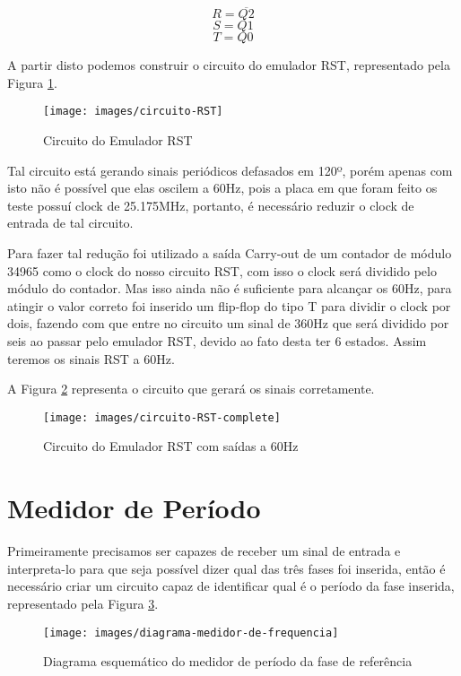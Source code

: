 $$R = \overline{Q2}$$
$$S = Q1$$
$$T = Q0$$

A partir disto podemos construir o circuito do emulador RST, representado pela Figura \ref{fig:circuito-RST}.

\begin{figure}[!htp]
	\centering
	\caption{Circuito do Emulador RST}
	\texttt{[image: images/circuito-RST]}
	\label{fig:circuito-RST}
\end{figure}

Tal circuito está gerando sinais periódicos defasados em 120º, porém apenas com isto não é possível que elas oscilem a 60Hz, pois a placa em que foram feito os teste possuí clock de 25.175MHz, portanto, é necessário reduzir o clock de entrada de tal circuito. 

Para fazer tal redução foi utilizado a saída Carry-out de um contador de módulo 34965 como o clock do nosso circuito RST, com isso o clock será dividido pelo módulo do contador. Mas isso ainda não é suficiente para alcançar os 60Hz, para atingir o valor correto foi inserido um flip-flop do tipo T para dividir o clock por dois, fazendo com que entre no circuito um sinal de 360Hz que será dividido por seis ao passar pelo emulador RST, devido ao fato desta ter 6 estados. Assim teremos os sinais RST a 60Hz.

A Figura \ref{fig:circuito-RST-complete} representa o circuito que gerará os sinais corretamente.

\begin{figure}[!htp]
	\centering
	\caption{Circuito do Emulador RST com saídas a 60Hz}
	\texttt{[image: images/circuito-RST-complete]}
	\label{fig:circuito-RST-complete}
\end{figure}

\section{Medidor de Período}

Primeiramente precisamos ser capazes de receber um sinal de entrada e interpreta-lo para que seja possível dizer qual das três fases foi inserida, então é necessário criar um circuito capaz de identificar qual é o período da fase inserida, representado pela Figura \ref{fig:diagrama-medidor-de-frequencia}.

\begin{figure}[!htp]
	\centering
	\caption{Diagrama esquemático do medidor de período da fase de referência}
	\texttt{[image: images/diagrama-medidor-de-frequencia]}
	\label{fig:diagrama-medidor-de-frequencia}
\end{figure}

